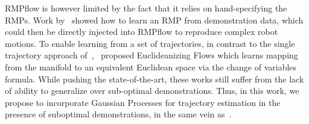 RMPflow is however limited by the fact that it relies on hand-specifying the RMPs. Work by~\cite{Rana20corl} showed how to learn an RMP from demonstration data, which could then be directly injected into RMPflow to reproduce complex robot motions. To enable learning from a set of trajectories, in contrast to the single trajectory approach of~\cite{Rana20corl},~\citet{Rana20ldc} proposed Euclideanizing Flows which learns mapping from the manifold to an equivalent Euclidean space via the change of variables formula.
While pushing the state-of-the-art, these works still suffer from the lack of ability to generalize over sub-optimal demonstrations.
Thus, in this work, we propose to incorporate Gaussian Processes for trajectory estimation in the presence of suboptimal demonstrations, in the same vein as~\cite{Chen20corl_ssrr,Levine11neurips}.
